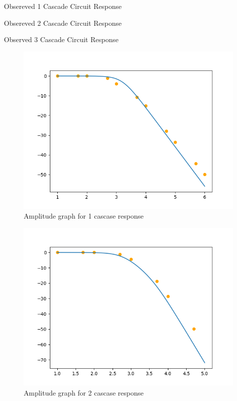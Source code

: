 \documentclass[journal]{IEEEtran}
\begin{document}
\begin{table}[h]
    \centering
    
    \caption{Obsereved 1 Cascade Circuit Response}
\end{table}

\begin{table}[h]
    \centering
    
    \caption{Obsereved 2 Cascade Circuit Response}
\end{table}

\begin{table}[h]
    \centering
    
    \caption{Observed 3 Cascade Circuit Response}
\end{table}

\begin{figure}[h]
    \centering
    \includegraphics[width=0.7\columnwidth]{figs/Afig1.png}
    \caption{Amplitude graph for 1 cascase response}
\end{figure}

\begin{figure}[h]
    \centering
    \includegraphics[width=0.7\columnwidth]{figs/Afig2.png}
    \caption{Amplitude graph for 2 cascase response}
\end{figure}
\end{document}

